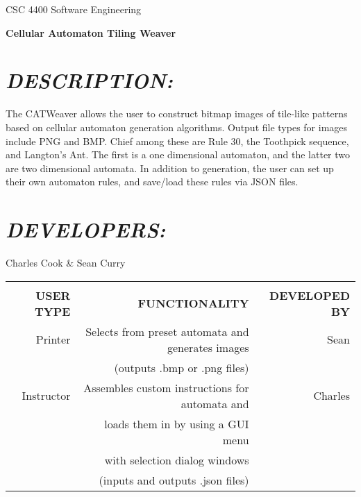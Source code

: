 \documentclass[12pt]{article}
\begin{document}
	\begin{Center}
		CSC 4400 Software Engineering
		\linebreak

		\LARGE
		\textbf{Cellular Automaton Tiling Weaver}
	\end{Center}

	\begin{FlushLeft}
		\section*{\textit{DESCRIPTION:}}
		The CATWeaver allows the user to construct bitmap images of tile-like patterns based on cellular automaton generation algorithms. Output file types for images include PNG and BMP. Chief among these are Rule 30, the Toothpick sequence, and Langton's Ant. The first is a one dimensional automaton, and the latter two are two dimensional automata. In addition to generation, the user can set up their own automaton rules, and save/load these rules via JSON files.
		\section*{\textit{DEVELOPERS:}}
		Charles Cook \& Sean Curry
		\linebreak \linebreak

		\begin{tabular}{|r|r|r|}
			\hline & & \\
			\large \textbf{USER TYPE} & \large \textbf{FUNCTIONALITY} & \large \textbf{DEVELOPED BY}
			\\ \hline
			Printer & Selects from preset automata and generates images & Sean
			\\
			& (outputs .bmp or .png files) &
			\\ \hline
			Instructor & Assembles custom instructions for automata and & Charles
			\\
			& loads them in by using a GUI menu &
			\\
			& with selection dialog windows &
			\\
			& (inputs and outputs .json files) &
			\\ \hline
		\end{tabular}


\end{FlushLeft}
\end{document}
